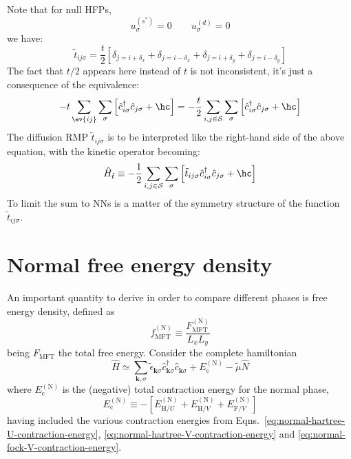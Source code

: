 Note that for null HFPs,
\[
	u_\sigma^{(s^*)} = 0
	\qquad
	u_\sigma^{(d)} = 0
\]
we have:
\[
	\tilde{t}_{ij\sigma} = \frac{t}{2} \left[
		\delta_{j=i+\delta_x} + \delta_{j=i-\delta_x} + \delta_{j=i+\delta_y} + \delta_{j=i-\delta_y}
	\right]
\]
The fact that $t/2$ appears here instead of $t$ is not inconsistent, it's just a consequence of the equivalence:
\[
	-t \sum_{\ev{ij}} \sum_\sigma \left[
		\hat c_{i\sigma}^\dagger \hat c_{j\sigma} + \hc
	\right] = -\frac{t}{2} \sum_{i,j \in \mathcal{S}} \sum_\sigma \left[
		\hat c_{i\sigma}^\dagger \hat c_{j\sigma} + \hc
	\right]
\]
The diffusion RMP $\tilde{t}_{ij\sigma}$ is to be interpreted like the right-hand side of the above equation, with the kinetic operator becoming:
\[
	\hat H_{\tilde{t}} \equiv -\frac{1}{2} \sum_{i,j \in \mathcal{S}} \sum_\sigma \left[
		\tilde{t}_{ij\sigma} \hat c_{i\sigma}^\dagger \hat c_{j\sigma} + \hc
	\right]
\]
To limit the sum to NNs is a matter of the symmetry structure of the function $\tilde{t}_{ij\sigma}$.

\section{Normal free energy density}\label{sec:normal-free-energy}

An important quantity to derive in order to compare different phases is free energy density, defined as
\[
	f_\mathrm{MFT}^{(\mathrm{N})} \equiv \frac{F_\mathrm{MFT}^{(\mathrm{N})}}{L_x L_y}
\]
being $F_\mathrm{MFT}$ the total free energy. Consider the complete hamiltonian
\[
	\hat H \simeq \sum_{\mathbf{k},\sigma} \tilde{\epsilon}_{\mathbf{k}\sigma} \hat c_{\mathbf{k}\sigma}^\dagger \hat c_{\mathbf{k}\sigma} + E_\mathrm{c}^{(\mathrm{N})} - \tilde{\mu} \hat N
\]
where $E_\mathrm{c}^{(\mathrm{N})}$ is the (negative) total contraction energy for the normal phase,
\[
	E_\mathrm{c}^{(\mathrm{N})} \equiv
	-\left[
		E_{\mathrm{H}/U}^{(\mathrm{N})} + E_{\mathrm{H}/V}^{(\mathrm{N})} +  E_{\mathrm{F}/V}^{(\mathrm{N})}
	\right]
\]
having included the various contraction energies from Eqns.~\eqref{eq:normal-hartree-U-contraction-energy}, \eqref{eq:normal-hartree-V-contraction-energy} and \eqref{eq:normal-fock-V-contraction-energy}.


